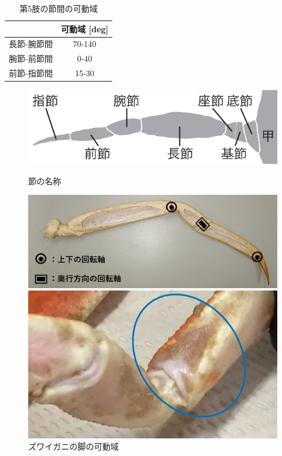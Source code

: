 %
\begin{table}[htbp]
  \centering
  \vspace{5mm}
  \caption{第5肢の節間の可動域}
  \label{tab:5kadou}
  \vspace{-3mm}
  \begin{tabular}{|l|c|}
  \hline
         & \multicolumn{1}{l|}{可動域 [deg]} \\ \hline
  長節-腕節間 & 70-140                        \\ \hline
  腕節-前節間 & 0-40                          \\ \hline
  前節-指節間 & 15-30                         \\ \hline
  \end{tabular}
  \end{table}
\begin{figure}[t]
%
  \begin{minipage}{1\hsize}
    \centering
    \includegraphics[scale=0.52]{image/setu.PNG}
    \caption{節の名称\cite{crabnature}}
    \vspace{3mm}
    \label{fig:setu}
  \end{minipage}
%
  \begin{minipage}{1\hsize}
    \centering
    \includegraphics[scale=0.26]{image/kaiten.png}
    \caption{ズワイガニの脚の可動域}
    \label{fig:kaiten}
  \end{minipage}
  \begin{minipage}{0.5\hsize}
    \centering
    \vspace{3mm}
    \includegraphics[scale=0.24]{image/maku1.JPG}

\end{minipage}
\end{figure}
